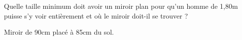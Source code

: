 \begin{Exercise}[title=Taille d'un miroir]
Quelle taille minimum doit avoir un miroir plan pour qu’un homme de 1,80m puisse s’y voir entièrement et où le miroir doit-il se trouver ?
\end{Exercise}
\begin{Answer}
Miroir de 90cm placé à 85cm du sol.
\end{Answer}

